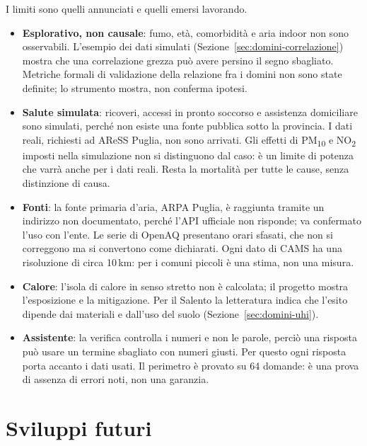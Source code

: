 I limiti sono quelli annunciati e quelli emersi lavorando.
\begin{itemize}
  \item \textbf{Esplorativo, non causale}: fumo, età, comorbidità e aria indoor non sono osservabili. L'esempio dei dati simulati (Sezione~\ref{sec:domini-correlazione}) mostra che una correlazione grezza può avere persino il segno sbagliato. Metriche formali di validazione della relazione fra i domini non sono state definite; lo strumento mostra, non conferma ipotesi.
  \item \textbf{Salute simulata}: ricoveri, accessi in pronto soccorso e assistenza domiciliare sono simulati, perché non esiste una fonte pubblica sotto la provincia. I dati reali, richiesti ad AReSS Puglia, non sono arrivati. Gli effetti di PM\textsubscript{10} e NO\textsubscript{2} imposti nella simulazione non si distinguono dal caso: è un limite di potenza che varrà anche per i dati reali. Resta la mortalità per tutte le cause, senza distinzione di causa.
  \item \textbf{Fonti}: la fonte primaria d'aria, ARPA Puglia, è raggiunta tramite un indirizzo non documentato, perché l'API ufficiale non risponde; va confermato l'uso con l'ente. Le serie di OpenAQ presentano orari sfasati, che non si correggono ma si convertono come dichiarati. Ogni dato di CAMS ha una risoluzione di circa 10\,km: per i comuni piccoli è una stima, non una misura.
  \item \textbf{Calore}: l'isola di calore in senso stretto non è calcolata; il progetto mostra l'esposizione e la mitigazione. Per il Salento la letteratura indica che l'esito dipende dai materiali e dall'uso del suolo (Sezione~\ref{sec:domini-uhi}).
  \item \textbf{Assistente}: la verifica controlla i numeri e non le parole, perciò una risposta può usare un termine sbagliato con numeri giusti. Per questo ogni risposta porta accanto i dati usati. Il perimetro è provato su 64 domande: è una prova di assenza di errori noti, non una garanzia.
\end{itemize}

\section{Sviluppi futuri}

